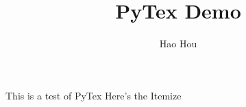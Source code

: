 \documentclass[10pt]{article}
\author{Hao Hou}
\title{PyTex Demo}
\begin{document}
\maketitle
This is a test of PyTex
Here's the Itemize


\end{document}
